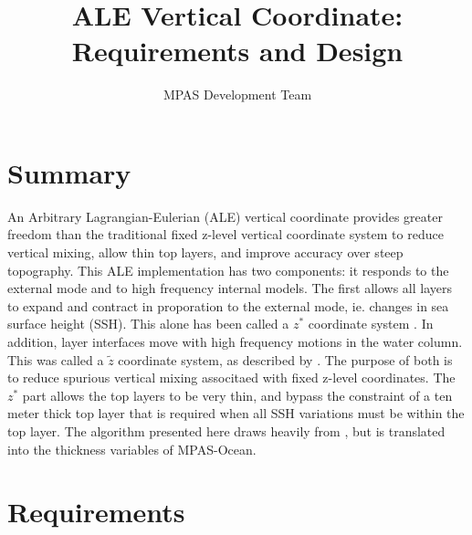 \documentclass[11pt]{report}
\begin{document}
\title{ALE Vertical Coordinate: \\
Requirements and Design}
\author{MPAS Development Team}


 
\maketitle
\tableofcontents


\chapter{Summary}

An Arbitrary Lagrangian-Eulerian (ALE) vertical coordinate provides greater freedom than the traditional fixed z-level vertical coordinate system to reduce vertical mixing, allow thin top layers, and improve accuracy over steep topography.  This ALE implementation has two components: it responds to the external mode and to high frequency internal models.  The first allows all layers to expand and contract in proporation to the external mode, ie. changes in sea surface height (SSH).  This alone has been called a $z^*$ coordinate system \citep{Adcroft:2004tv,Campin:2004wj}.  In addition, layer interfaces move with high frequency motions in the water column.  This was called a ${\tilde z}$ coordinate system, as described by \citet{Leclair_Madec11om}.  The purpose of both is to reduce spurious vertical mixing associtaed with fixed z-level coordinates.  The $z^*$ part allows the top layers to be very thin, and bypass the constraint of a ten meter thick top layer that is required when all SSH variations must be within the top layer.  The algorithm presented here draws heavily from \citet{Leclair_Madec11om}, but is translated into the thickness variables of MPAS-Ocean.



\chapter{Requirements}
\end{document}
